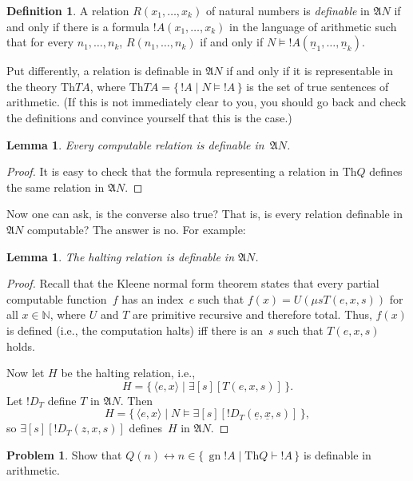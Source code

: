 \documentclass[10pt,a4paper]{article}
\theoremstyle{plain}
\newtheorem{lem}[thm]{Lemma}
\theoremstyle{definition}
\newtheorem{defn}[thm]{Definition}
\newtheorem{prob}{Problem}[section]
\theoremstyle{remark}
\providecommand{\lexists}{\mathord{\exists}}
\providecommand{\Proves}{\mathrel{\vdash}}
\providecommand{\Struct}{\ensuremath{\mathfrak{A}}}
\providecommand{\Sat}[2]{\ensuremath{#1 \models #2}}
\providecommand{\Th}{\ensuremath{\mathrm{Th}}}
\providecommand{\tuple}[1]{\langle #1 \rangle}
\providecommand{\num}[1]{\underline{#1}}
\providecommand{\Nat}{\ensuremath{\mathbb{N}}}
\providecommand{\Setabs}[2]{\{\, #1 \mid #2 \,\}}
\providecommand{\Gn}{\operatorname{gn}}
\providecommand{\umin}{\mu}
\providecommand{\defiff}{\mathrel{\leftrightarrow}}
\providecommand{\defiff}{\mathrel{\leftrightarrow}}
\begin{document}
\begin{defn}
A relation $R(x_1,\dots,x_k)$ of natural numbers is \emph{definable}
in $\Struct{N}$ if and only if there is a formula $!A(x_1,\dots,x_k)$
in the language of arithmetic such that for every $n_1,\dots,n_k$,
$R(n_1,\dots,n_k)$ if and only if $\Sat{N}{!A(\num n_1,\dots,\num
  n_k)}$.
\end{defn}

Put differently, a relation is definable in $\Struct{N}$ if and
only if it is representable in the theory $\Th{TA}$, where $\Th{TA} =
\Setabs{!A}{\Sat{N}{!A}}$ is the set of true sentences of
arithmetic. (If this is not immediately clear to you, you should go
back and check the definitions and convince yourself that this is the
case.)

\begin{lem}
Every computable relation is definable in~$\Struct{N}$.
\end{lem}

\begin{proof}
It is easy to check that the formula representing a relation in
$\Th{Q}$ defines the same relation in $\Struct{N}$. 
\end{proof}

Now one can ask, is the converse also true?  That is, is every
relation definable in~$\Struct{N}$ computable? The answer is no. For
example:

\begin{lem}
The halting relation is definable in $\Struct{N}$.
\end{lem}

\begin{proof}
Recall that the Kleene normal form theorem states that every partial
computable function~$f$ has an index~$e$ such that $f(x) =
U(\umin{s}{T(e,x,s)})$ for all $x \in \Nat$, where $U$ and $T$ are
primitive recursive and therefore total. Thus, $f(x)$ is defined
(i.e., the computation halts) iff there is an~$s$ such that $T(e,x,s)$
holds.

Now let $H$ be the halting relation, i.e.,
\[
H = \Setabs{\tuple{e,x}}{\lexists[s][T(e, x, s)]}.
\]
Let $!D_T$ define $T$ in $\Struct{N}$. Then
\[
H = \Setabs{\tuple{e,x}}{\Sat{N}{\lexists[s][!D_T(\num e, \num x, s)]}},
\]
so $\lexists[s][!D_T(z, x, s)]$ defines~$H$ in $\Struct{N}$. 
\end{proof}

\begin{prob}
Show that $Q(n) \defiff n \in \Setabs{\Gn{!A}}{\Th{Q} \Proves !A}$ is
  definable in arithmetic.
\end{prob}
\end{document}
